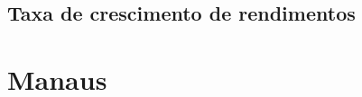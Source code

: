 \documentclass[8pt]{beamer}
\begin{document}
\subsection{Taxa de crescimento de rendimentos}

\begin{frame}
\textit{\hyperlink{indice_principal_amz_pa}{}}

\end{frame}

\begin{frame}
\textit{\hyperlink{indice_principal_amz_pa}{}}

\end{frame}

\begin{frame}
\textit{\hyperlink{indice_principal_amz_pa}{}}

\end{frame}

\section{Manaus}
\end{document}
